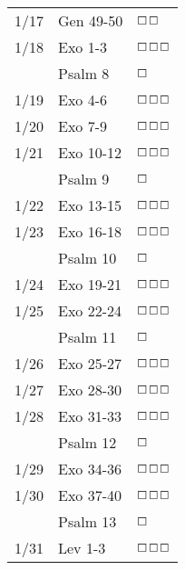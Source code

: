 \documentclass[10pt,landscape,letterpaper]{article}
\begin{document}
\begin{multicols}{5}
\begin{tabular}{p{0.15in}p{0.7in}p{0.5in}}
1/17 & Gen 49-50 & $\boxempty$$\boxempty$ \\
1/18 & Exo 1-3 & $\boxempty$$\boxempty$$\boxempty$ \\
 & \textcolor[rgb]{0.98,0.00,0.00}{Psalm 8} & \textcolor[rgb]{1.00,0.00,0.00}{$\boxempty$} \\
1/19 & Exo 4-6 & $\boxempty$$\boxempty$$\boxempty$ \\
1/20 & Exo 7-9 & $\boxempty$$\boxempty$$\boxempty$ \\
1/21 & Exo 10-12 & $\boxempty$$\boxempty$$\boxempty$ \\
 & \textcolor[rgb]{0.98,0.00,0.00}{Psalm 9} & \textcolor[rgb]{1.00,0.00,0.00}{$\boxempty$} \\
1/22 & Exo 13-15 & $\boxempty$$\boxempty$$\boxempty$ \\
1/23 & Exo 16-18 & $\boxempty$$\boxempty$$\boxempty$ \\
 & \textcolor[rgb]{0.98,0.00,0.00}{Psalm 10} & \textcolor[rgb]{1.00,0.00,0.00}{$\boxempty$} \\
1/24 & Exo 19-21 & $\boxempty$$\boxempty$$\boxempty$ \\
1/25 & Exo 22-24 & $\boxempty$$\boxempty$$\boxempty$ \\
 & \textcolor[rgb]{0.98,0.00,0.00}{Psalm 11} & \textcolor[rgb]{1.00,0.00,0.00}{$\boxempty$} \\
1/26 & Exo 25-27 & $\boxempty$$\boxempty$$\boxempty$ \\
1/27 & Exo 28-30 & $\boxempty$$\boxempty$$\boxempty$ \\
1/28 & Exo 31-33 & $\boxempty$$\boxempty$$\boxempty$ \\
 & \textcolor[rgb]{0.98,0.00,0.00}{Psalm 12} & \textcolor[rgb]{1.00,0.00,0.00}{$\boxempty$} \\
1/29 & Exo 34-36 & $\boxempty$$\boxempty$$\boxempty$ \\
1/30 & Exo 37-40 & $\boxempty$$\boxempty$$\boxempty$ \\
 & \textcolor[rgb]{0.98,0.00,0.00}{Psalm 13} & \textcolor[rgb]{1.00,0.00,0.00}{$\boxempty$} \\
1/31 & Lev 1-3 & $\boxempty$$\boxempty$$\boxempty$ \\
 \end{tabular}

\end{multicols}
\end{document}

